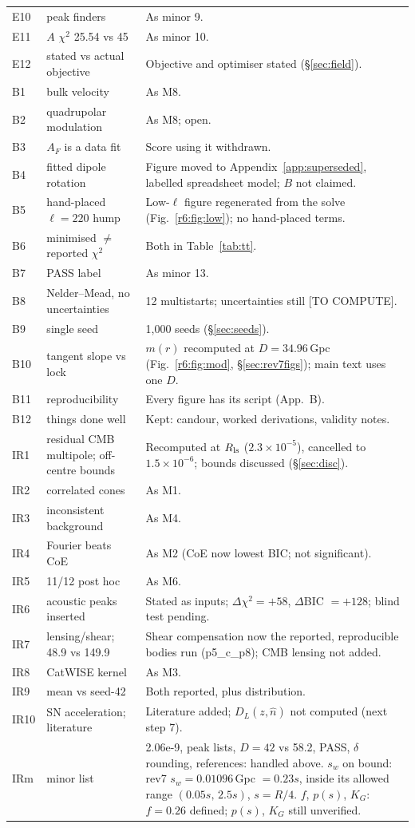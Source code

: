 \documentclass[11pt]{article}
\newcommand{\todo}[1]{\textsf{[#1]}}
\begin{document}
\begin{longtable}{@{}p{1.3cm}p{5.2cm}p{8.6cm}@{}}
E10 & peak finders & As minor 9.\\
E11 & $A$ $\chi^2$ 25.54 vs 45 & As minor 10.\\
E12 & stated vs actual objective & Objective and optimiser stated (\S\ref{sec:field}).\\
B1 & bulk velocity & As M8.\\
B2 & quadrupolar modulation & As M8; open.\\
B3 & $A_F$ is a data fit & Score using it withdrawn.\\
B4 & fitted dipole rotation & Figure moved to Appendix~\ref{app:superseded}, labelled spreadsheet model; $B$ not claimed.\\
B5 & hand-placed $\ell=220$ hump & Low-$\ell$ figure regenerated from the solve (Fig.~\ref{r6:fig:low}); no hand-placed terms.\\
B6 & minimised $\ne$ reported $\chi^2$ & Both in Table~\ref{tab:tt}.\\
B7 & PASS label & As minor 13.\\
B8 & Nelder--Mead, no uncertainties & 12 multistarts; uncertainties still \todo{TO COMPUTE}.\\
B9 & single seed & 1,000 seeds (\S\ref{sec:seeds}).\\
B10 & tangent slope vs lock & $m(r)$ recomputed at $D=34.96$\,Gpc (Fig.~\ref{r6:fig:mod}, \S\ref{sec:rev7figs}); main text uses one $D$.\\
B11 & reproducibility & Every figure has its script (App.~B).\\
B12 & things done well & Kept: candour, worked derivations, validity notes.\\
IR1 & residual CMB multipole; off-centre bounds & Recomputed at $R_{\rm ls}$ ($2.3\times10^{-5}$), cancelled to $1.5\times10^{-6}$; bounds discussed (\S\ref{sec:disc}).\\
IR2 & correlated cones & As M1.\\
IR3 & inconsistent background & As M4.\\
IR4 & Fourier beats CoE & As M2 (CoE now lowest BIC; not significant).\\
IR5 & 11/12 post hoc & As M6.\\
IR6 & acoustic peaks inserted & Stated as inputs; $\Delta\chi^2=+58$, $\Delta$BIC $=+128$; blind test pending.\\
IR7 & lensing/shear; 48.9 vs 149.9 & Shear compensation now the reported, reproducible bodies run (p5\_c\_p8); CMB lensing not added.\\
IR8 & CatWISE kernel & As M3.\\
IR9 & mean vs seed-42 & Both reported, plus distribution.\\
IR10 & SN acceleration; literature & Literature added; $D_L(z,\hat n)$ not computed (next step 7).\\
IRm & minor list & 2.06e-9, peak lists, $D=42$ vs 58.2, PASS, $\delta$ rounding, references: handled above. $s_w$ on bound: rev7 $s_w=0.01096$\,Gpc $=0.23s$, inside its allowed range $(0.05s,\,2.5s)$, $s=R/4$. $f$, $p(s)$, $K_G$: $f=0.26$ defined; $p(s)$, $K_G$ still unverified.\\\bottomrule
\end{longtable}
\clearpage
\end{document}
